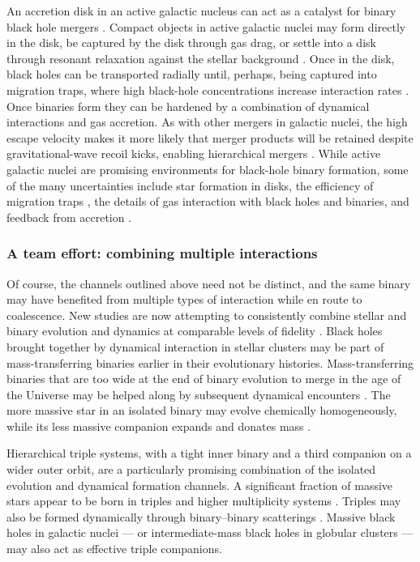 \documentclass[review]{elsarticle}
\begin{document}
An accretion disk in an active galactic nucleus can act as a catalyst for binary black hole mergers \citep{Bellovary:2016, Bartos:2016, Stone:2016, McKernan:2018, Tagawa:2020}.   Compact objects in active galactic nuclei may form directly in the disk, be captured by the disk through gas drag, or settle into a disk through resonant relaxation against the stellar background \citep{SzolgyenKocsis:2018}.  Once in the disk, black holes can be transported radially until, perhaps, being captured into migration traps, where high black-hole concentrations increase interaction rates \citep{Bellovary:2016,Yang:2019,Secunda:2019,PengChen:2021}.  Once binaries form they can be hardened by a combination of dynamical interactions and gas accretion.  As with other mergers in galactic nuclei, the high escape velocity makes it more likely that merger products will be retained despite gravitational-wave recoil kicks, enabling hierarchical mergers \citep{Yang:2019,Secunda:2020,Tagawa:2021}.  While active galactic nuclei are promising environments for black-hole binary formation, some of the many uncertainties include star formation in disks, the efficiency of migration traps \citep{PanYang:2021}, the details of gas interaction with black holes and binaries, and feedback from accretion \citep{Tagawa:2020}.


\subsubsection{A team effort: combining multiple interactions}

Of course, the channels outlined above need not be distinct, and the same binary may have benefited from multiple types of interaction while en route to coalescence.   New studies are now attempting to consistently combine stellar and binary evolution and dynamics at comparable levels of fidelity \citep[e.g.,][]{Santoliquido:2020}.  Black holes brought together by dynamical interaction in stellar clusters may be part of mass-transferring binaries earlier in their evolutionary histories.  Mass-transferring binaries that are too wide at the end of binary evolution to merge in the age of the Universe may be helped along by subsequent dynamical encounters \citep[e.g.,][]{Belczynski:2014VMS}.  The more massive star in an isolated binary may evolve chemically homogeneously, while its less massive companion expands and donates mass \citep{Marchant:2017}.  

Hierarchical triple systems, with a tight inner binary and a third companion on a wider outer orbit, are a particularly promising combination of the isolated evolution and dynamical formation channels.  A significant fraction of massive stars appear to be born in triples and higher multiplicity systems \citep{DucheneKraus:2013, Tokovinin:2021}.  Triples may also be formed dynamically through binary--binary scatterings \citep{MillerHamilton:2002b, Trani:2021}.  Massive black holes in galactic nuclei --- or intermediate-mass black holes in globular clusters --- may also act as effective triple companions.   
\end{document}
